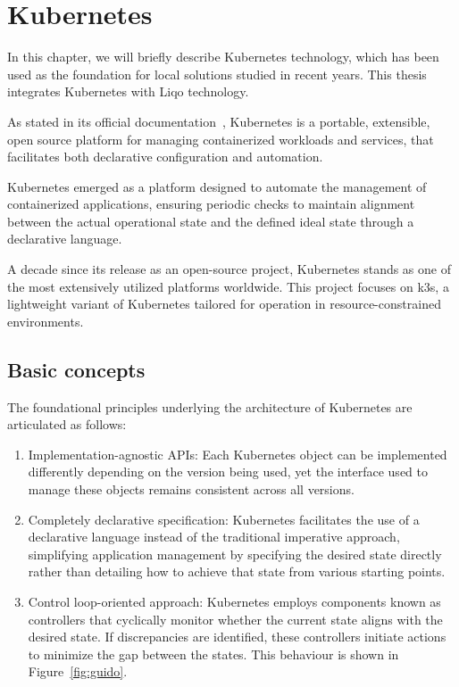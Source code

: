 \chapter{Kubernetes}
In this chapter, we will briefly describe Kubernetes technology, which has been used as the foundation for local solutions studied in recent years. This thesis integrates Kubernetes with Liqo technology.

As stated in its official documentation~\cite{k0-1}, Kubernetes is a portable, extensible, open source platform for managing containerized workloads and services, that facilitates both declarative configuration and automation.

Kubernetes emerged as a platform designed to automate the management of containerized applications, ensuring periodic checks to maintain alignment between the actual operational state and the defined ideal state through a declarative language.

A decade since its release as an open-source project, Kubernetes stands as one of the most extensively utilized platforms worldwide. This project focuses on k3s, a lightweight variant of Kubernetes tailored for operation in resource-constrained environments.

\section{Basic concepts}
The foundational principles underlying the architecture of Kubernetes are articulated as follows:
\begin{enumerate}
\item Implementation-agnostic APIs: Each Kubernetes object can be implemented differently depending on the version being used, yet the interface used to manage these objects remains consistent across all versions.
\item Completely declarative specification: Kubernetes facilitates the use of a declarative language instead of the traditional imperative approach, simplifying application management by specifying the desired state directly rather than detailing how to achieve that state from various starting points.
\item Control loop-oriented approach: Kubernetes employs components known as controllers that cyclically monitor whether the current state aligns with the desired state. If discrepancies are identified, these controllers initiate actions to minimize the gap between the states. This behaviour is shown in Figure~\ref{fig:guido}.
\end{enumerate}

